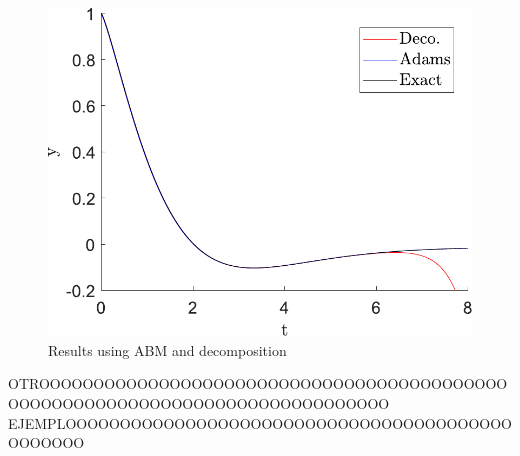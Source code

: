 \begin{figure}[H]
    \centering
    \includegraphics[scale=0.5]{files/adams_exact_deco.pdf}
    \caption{Results using ABM and decomposition}
    \label{fig:abm_decomp}
\end{figure}


OTROOOOOOOOOOOOOOOOOOOOOOOOOOOOOOOOOOOOOOOOOOOOOOOOOOOOOOOOOOOOOOOOOOOOOOOOOOOOOO EJEMPLOOOOOOOOOOOOOOOOOOOOOOOOOOOOOOOOOOOOOOOOOOOOOOOO
